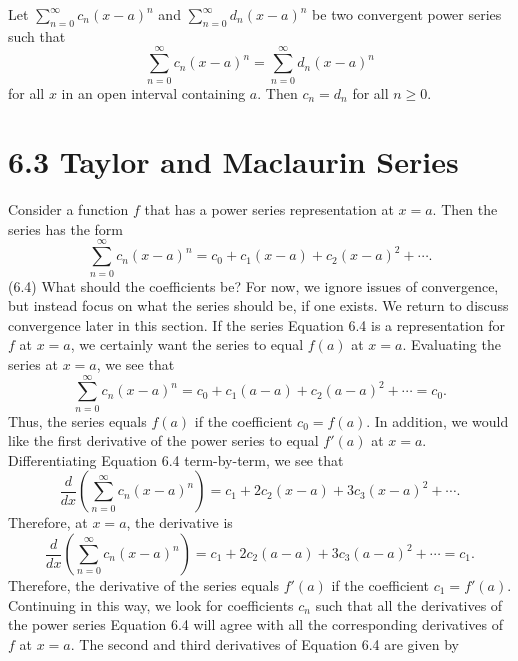 \documentclass{report}
\begin{document}
    \bigbreak \noindent 
    \begin{thrmm}
        Let $\sum_{n=0}^{\infty} c_n (x - a)^n$ and $\sum_{n=0}^{\infty} d_n (x - a)^n$ be two convergent power series such that
        \[
        \sum_{n=0}^{\infty} c_n (x - a)^n = \sum_{n=0}^{\infty} d_n (x - a)^n
        \]
        for all \( x \) in an open interval containing \( a \). Then \( c_n = d_n \) for all \( n \geq 0 \).
    \end{thrmm}

    \pagebreak 
    \section*{6.3 Taylor and Maclaurin Series}
    \bigbreak \noindent 
    Consider a function $f$ that has a power series representation at $x=a$. Then the series has the form
    \begin{equation}
        \sum_{n=0}^{\infty} c_n(x-a)^n = c_0 + c_1(x-a) + c_2(x-a)^2 + \cdots.
    \end{equation}
    (6.4)
    What should the coefficients be? For now, we ignore issues of convergence, but instead focus on what the series should be, if one exists. We return to discuss convergence later in this section. If the series Equation 6.4 is a representation for $f$ at $x=a$, we certainly want the series to equal $f(a)$ at $x=a$. Evaluating the series at $x=a$, we see that
    \begin{equation}
        \sum_{n=0}^{\infty} c_n(x-a)^n = c_0 + c_1(a-a) + c_2(a-a)^2 + \cdots = c_0.
    \end{equation}
    Thus, the series equals $f(a)$ if the coefficient $c_0 = f(a)$. In addition, we would like the first derivative of the power series to equal $f'(a)$ at $x=a$. Differentiating Equation 6.4 term-by-term, we see that
    \begin{equation}
        \frac{d}{dx}\left(\sum_{n=0}^{\infty} c_n(x-a)^n\right) = c_1 + 2c_2(x-a) + 3c_3(x-a)^2 + \cdots.
    \end{equation}
    Therefore, at $x=a$, the derivative is
    \begin{equation}
        \frac{d}{dx}\left(\sum_{n=0}^{\infty} c_n(x-a)^n\right) = c_1 + 2c_2(a-a) + 3c_3(a-a)^2 + \cdots = c_1.
    \end{equation}
    Therefore, the derivative of the series equals $f'(a)$ if the coefficient $c_1 = f'(a)$. Continuing in this way, we look for coefficients $c_n$ such that all the derivatives of the power series Equation 6.4 will agree with all the corresponding derivatives of $f$ at $x=a$. The second and third derivatives of Equation 6.4 are given by
\end{document}
